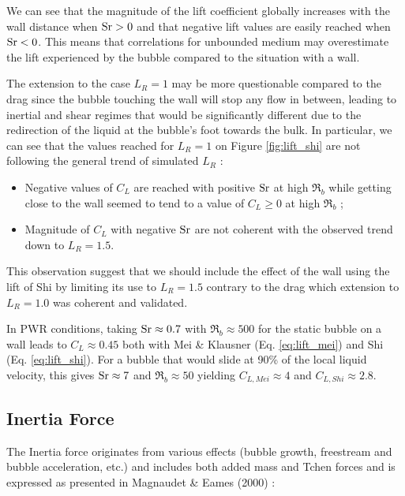 We can see that the magnitude of the lift coefficient globally increases with the wall distance when $\mathrm{Sr} >0$ and that negative lift values are easily reached when $\mathrm{Sr} <0$. This means that correlations for unbounded medium may overestimate the lift experienced by the bubble compared to the situation with a wall. 

The extension to the case $L_{R}=1$ may be more questionable compared to the drag since the bubble touching the wall will stop any flow in between, leading to inertial and shear regimes that would be significantly different due to the redirection of the liquid at the bubble's foot towards the bulk. In particular, we can see that the values reached for $L_{R}=1$ on Figure \ref{fig:lift_shi} are not following the general trend of simulated $L_{R}$ :

\begin{itemize}
\item Negative values of $C_{L}$ are reached with positive $\mathrm{Sr}$ at high $\Re_{b}$ while getting close to the wall seemed to tend to a value of $C_{L} \geq 0$ at high $\Re_{b}$ ;
\item Magnitude of $C_{L}$ with negative $\mathrm{Sr}$ are not coherent with the observed trend down to $L_{R}=1.5$.
\end{itemize}

This observation suggest that we should include the effect of the wall using the lift of Shi \etal by limiting its use to $L_{R}=1.5$ contrary to the drag which extension to $L_{R}=1.0$ was coherent and validated.

\npar

\begin{remark*}{}
In PWR conditions, taking $\mathrm{Sr} \approx 0.7$ with $\Re_{b} \approx 500$ for the static bubble on a wall leads to $C_{L}\approx 0.45$ both with Mei \& Klausner (Eq. \ref{eq:lift_mei}) and Shi \etal (Eq. \ref{eq:lift_shi}). For a bubble that would slide at 90\% of the local liquid velocity, this gives $\mathrm{Sr} \approx 7$ and $\Re_{b} \approx 50$ yielding $C_{L,Mei} \approx 4$ and $C_{L,Shi} \approx 2.8$.
\end{remark*}


\subsection{Inertia Force}
\label{subsec:AM}

The Inertia force originates from various effects (bubble growth, freestream and bubble acceleration, etc.) and includes both added mass and Tchen forces and is expressed as presented in Magnaudet \& Eames (2000) \cite{magnaudet_motion_2000}:

